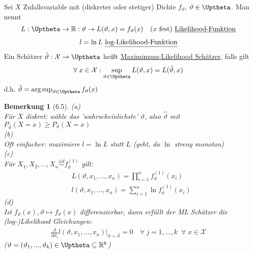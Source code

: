 \documentclass[a4paper,openany]{book}
\theoremstyle{mytheoremstyle}
\newtheorem*{bem}{Bemerkung}
\theoremstyle{mytheoremstyle2}
\begin{document}
\begin{defi}{6.4}{}
  Sei $X$ Zufallsvariable mit (diskreter oder stetiger) Dichte $f _{\vartheta }$, $\vartheta \in \Uptheta$. Man nennt
  \begin{align*}
    L:\Uptheta\to \mathbb{R}:\vartheta \to L(\vartheta ,x)=f _{\vartheta }(x) \quad (x\text{ fest})\text{  \underline{Likelihood-Funktion}}
  \end{align*}
  \begin{align*}
    l=\ln L \text{ \underline{log-Likelihood-Funktion}}
  \end{align*}
  Ein Schätzer $\hat{\vartheta }:\mathcal{X}\to \Uptheta$ heißt \underline{Maximimum-Likelihood Schätzer}, falls gilt 
  \begin{align*}
    \forall\;x \in \mathcal{X}:\sup _{\vartheta \in \Uptheta}L(\vartheta ,x)=L(\hat{\vartheta },x)
  \end{align*}
  d.h. $\hat{\vartheta }=\text{arg}\sup _{\vartheta \in \Uptheta} f _{\vartheta }(x)$ 
\end{defi} 
\begin{bem}[6.5]
  (a) \\
  Für $X$ diskret: wähle das 'wahrscheinlichste' $\vartheta $, also $\hat{\vartheta }$ mit $P _{\hat{\vartheta }}(X=x)\geq P _{\vartheta }(X=x)$  \\
  (b)\\
  Oft einfacher: maximiere $l=\ln L$ statt $L$ (geht, da $\ln$ streng monoton)   \\
  (c)\\
  Für $X_1,X_2,...,X_n \overset{iid}\sim f _{\vartheta }^{(1)}$ gilt:
  \begin{align*}
    &L(\vartheta ,x_1,...,x_n)=\prod_{i=1}^{n}{f _{\vartheta }^{(1)}(x_i)}\\
    &l(\vartheta ,x_1,...,x_n)=\sum_{i=1}^{n}{\ln f _{\vartheta }^{(1)}(x_i)}
  \end{align*}
  (d)\\
  Ist $f _{\vartheta }(x),\vartheta \mapsto f _{\vartheta }(x)$ differenzierbar, dann erfüllt der ML Schätzer die (log-)Likelihood Gleichungen:
  \begin{align*}
    \frac{\partial }{\partial \vartheta _i}l(\vartheta ,x_1,...,x_n)\bigg|_{\vartheta =\hat{\vartheta }}^{}=0\quad \forall\;j=1,...,k\;\;\forall\;x \in \mathcal{X}
  \end{align*}
  ($\vartheta =(\vartheta _1,...,\vartheta _k)\in \Uptheta \subseteq \mathbb{R}^k$)
\end{bem}
\end{document}
